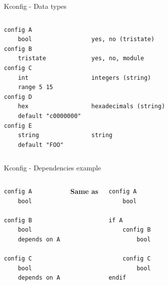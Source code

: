 \documentclass[mathserif,serif]{beamer}
\begin{document}
\begin{frame}[t,fragile]{Kconfig - Data types}
    \begin{columns}[T]
    \begin{lstlisting}
config A
    bool
config B
    tristate
config C
    int
    range 5 15
config D
    hex
    default "c0000000"
config E
    string
    default "FOO"
    \end{lstlisting}
    \begin{lstlisting}

yes, no (tristate)

yes, no, module

integers (string)


hexadecimals (string)


string
    \end{lstlisting}
    \end{columns}
\end{frame}

\begin{frame}[t,fragile]{Kconfig - Dependencies example}
    \begin{columns}[t]
    \begin{lstlisting}
config A
    bool

config B
    bool
    depends on A

config C
    bool
    depends on A
    \end{lstlisting}

    \textbf{Same as}

    \begin{lstlisting}
config A
    bool

if A
    config B
        bool
    
    config C
        bool
endif
    \end{lstlisting}
    \end{columns}
\end{frame}
\end{document}
